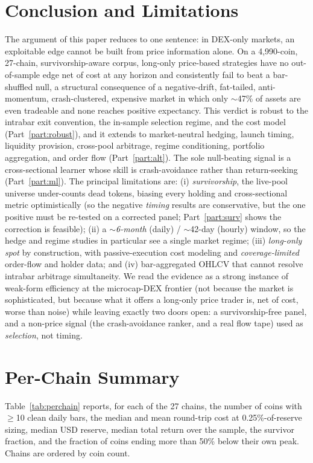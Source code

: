 \documentclass[12pt]{article}
\begin{document}
\section{Conclusion and Limitations}\label{sec:concl}
The argument of this paper reduces to one sentence: in DEX-only markets, an exploitable edge cannot be built from price information alone. On a 4{,}990-coin, 27-chain, survivorship-aware corpus, long-only price-based strategies have no out-of-sample edge net of cost at any horizon and consistently fail to beat a bar-shuffled null, a structural consequence of a negative-drift, fat-tailed, anti-momentum, crash-clustered, expensive market in which only $\sim$47\% of assets are even tradeable and none reaches positive expectancy. This verdict is robust to the intrabar exit convention, the in-sample selection regime, and the cost model (Part~\ref{part:robust}), and it extends to market-neutral hedging, launch timing, liquidity provision, cross-pool arbitrage, regime conditioning, portfolio aggregation, and order flow (Part~\ref{part:alt}). The sole null-beating signal is a cross-sectional learner whose skill is crash-avoidance rather than return-seeking (Part~\ref{part:ml}). The principal limitations are: (i) \emph{survivorship}, the live-pool universe under-counts dead tokens, biasing every holding and cross-sectional metric optimistically (so the negative \emph{timing} results are conservative, but the one positive must be re-tested on a corrected panel; Part~\ref{part:surv} shows the correction is feasible); (ii) a \emph{$\sim$6-month} (daily) / $\sim$42-day (hourly) window, so the hedge and regime studies in particular see a single market regime; (iii) \emph{long-only spot} by construction, with passive-execution cost modeling and \emph{coverage-limited} order-flow and holder data; and (iv) bar-aggregated OHLCV that cannot resolve intrabar arbitrage simultaneity. We read the evidence as a strong instance of weak-form efficiency at the microcap-DEX frontier (not because the market is sophisticated, but because what it offers a long-only price trader is, net of cost, worse than noise) while leaving exactly two doors open: a survivorship-free panel, and a non-price signal (the crash-avoidance ranker, and a real flow tape) used as \emph{selection}, not timing.

\appendix
\section{Per-Chain Summary}\label{app:perchain}
Table~\ref{tab:perchain} reports, for each of the 27 chains, the number of coins with $\geq$10 clean daily bars, the median and mean round-trip cost at 0.25\%-of-reserve sizing, median USD reserve, median total return over the sample, the survivor fraction, and the fraction of coins ending more than 50\% below their own peak. Chains are ordered by coin count.
\end{document}
